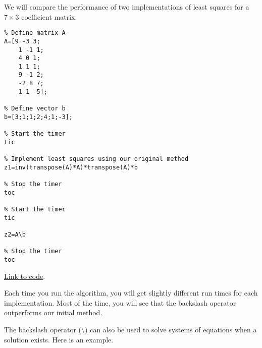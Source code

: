 \documentclass{ximera}
\begin{document}
\begin{template}\label{temp:LeastSquaresComp}
We will compare the performance of two implementations of least squares for a $7\times 3$ coefficient matrix.

    \begin{verbatim}
% Define matrix A
A=[9 -3 3;
    1 -1 1;
    4 0 1;
    1 1 1; 
    9 -1 2;
    -2 8 7;
    1 1 -5];
        
% Define vector b
b=[3;1;1;2;4;1;-3];

% Start the timer
tic

% Implement least squares using our original method
z1=inv(transpose(A)*A)*transpose(A)*b

% Stop the timer
toc

% Start the timer
tic

z2=A\b

% Stop the timer
toc
    \end{verbatim}

\href{https://sagecell.sagemath.org/?z=eJx9TkFqwzAQvAv0h7kE0oKgslPaYHww9NJzjkkPsrtNBJbkSusQ8vpYxCnNod1Zlh12htkF3ujLeoIzHO0JjRRNvV1DlSgrKTCVhtLQM1nh6WfXGRWuZJ1VxXxRBV7x8kumnj9mlkuKxS32SB2HiFaKtt6WlZ5QVKtpqjI7snLDJjL4QGDrKErBtrte3t3QkyPP6MkkRvoeTaSEMVm_RxgjQrR7600PR3wIn1KcdW39ccnR-DSERMvm4XHqO97ecsNwFxu6_x86F3Wz-9t8Af-UXbs=&lang=octave&interacts=eJyLjgUAARUAuQ==}{Link to code}.   

Each time you run the algorithm, you will get slightly different run times for each implementation.  Most of the time, you will see that the backslash operator outperforms our initial method. 
\end{template}



The 
backslash operator ($\setminus$) can also be used to solve systems of equations when a solution exists.  Here is an example.
\end{document}
